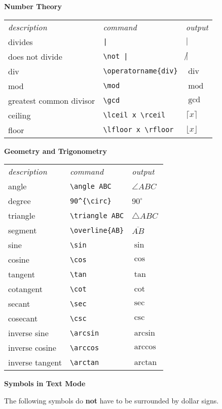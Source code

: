 \documentclass[10pt,landscape]{article}
\newcommand{\ColorSection}[1]{\par\vspace{1.5ex}\noindent\textcolor{sectioncolor}{\Large\bfseries #1}\par\vspace{0.75ex}}
\newcommand{\ColorSubsection}[1]{\par\vspace{1ex}\noindent\textcolor{subsectioncolor}{\normalsize\bfseries #1}\par\vspace{0.5ex}}
\begin{document}
\begin{multicols}{3}
\columnbreak
\ColorSubsection{Number Theory}
\begin{tabular}{lll}
\emph{description} & \emph{command} & \emph{output}\\
divides & \verb!|! & $|$\\
does not divide & \verb!\not |! & $\not |$\\
div & \verb!\operatorname{div}! & $\operatorname{div}$\\
mod & \verb!\mod! & $\operatorname{mod}$\\
greatest common divisor & \verb!\gcd! & $\gcd$\\
ceiling & \verb!\lceil x \rceil! & $\lceil x\rceil$\\
floor & \verb!\lfloor x \rfloor! & $\lfloor x \rfloor$\\
\end{tabular}




\ColorSubsection{Geometry and Trigonometry}
\begin{tabular}{lll}
\emph{description} & \emph{command} & \emph{output}\\
angle& \verb!\angle ABC! & $\angle ABC$\\
degree& \verb!90^{\circ}! & $90^{\circ}$\\
triangle& \verb!\triangle ABC! & $\triangle ABC$\\
segment& \verb!\overline{AB}! & $\overline{AB}$\\
sine& \verb!\sin! & $\sin$\\
cosine& \verb!\cos! & $\cos$\\
tangent& \verb!\tan! & $\tan$\\
cotangent& \verb!\cot! & $\cot$\\
secant& \verb!\sec! & $\sec$\\
cosecant& \verb!\csc! & $\csc$\\
inverse sine& \verb!\arcsin! & $\arcsin$\\
inverse cosine& \verb!\arccos! & $\arccos$\\
inverse tangent& \verb!\arctan! & $\arctan$\\
\end{tabular}

\ColorSection{Symbols in Text Mode}

The following symbols do \textbf{not} have to be surrounded by dollar signs.


\end{multicols}
\end{document}
